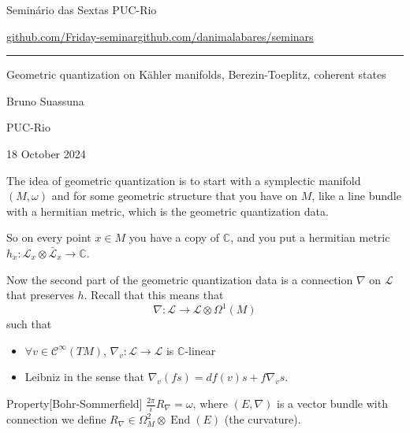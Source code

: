 


\begin{minipage}{\textwidth}
	\begin{minipage}{1\textwidth}
		Semin\'ario das Sextas \hfill PUC-Rio
		
		{\small\href{https://github.com/Friday-seminar/}{github.com/Friday-seminar}\hfill\href{https://github.com/danimalabares/seminars}{github.com/danimalabares/seminars}}
		\end{minipage}
\end{minipage}\vspace{.2cm}\hrule

\vspace{10pt}

{\Huge Geometric quantization on Kähler manifolds, Berezin-Toeplitz, coherent states}

\hfill{\Large Bruno Suassuna}

\hfill{\Large PUC-Rio}

\hfill{\large 18 October 2024}

The idea of geometric quantization is to start with a symplectic manifold $(M,\omega)$ and for some geometric structure that you have on $M$, like a line bundle with a hermitian metric, which is the geometric quantization data. 

So on every point $x \in M$ you have a copy of $\mathbb{C}$, and you put a hermitian metric $h_x:\mathcal{L}_x\otimes \bar{\mathcal{L}}_x\to \mathbb{C} $.

Now the second part of the geometric quantization data is a connection $\nabla$ on $\mathcal{L}$ that preserves $h$. Recall that this means that
\[\nabla :\mathcal{L}\to \mathcal{L}\otimes \Omega^{1}(M)\]
such that
\begin{itemize}
\item $\forall v\in\mathcal{C}^\infty(TM)$, $\nabla_v:\mathcal{L}\to  \mathcal{L}$ is $\mathbb{C}$-linear
\item Leibniz in the sense that $\nabla_v(fs)=df(v)s+f \nabla_vs$.
\end{itemize}

\begin{thing6}{Property}[Bohr-Sommerfield]\leavevmode
	$\frac{2\pi}{i}R_\nabla =\omega$, where $(E,\nabla )$ is a vector bundle with connection we define $R_\nabla \in\Omega^{2}_M \otimes \operatorname{End}(E)$ (the curvature).
\end{thing6}

